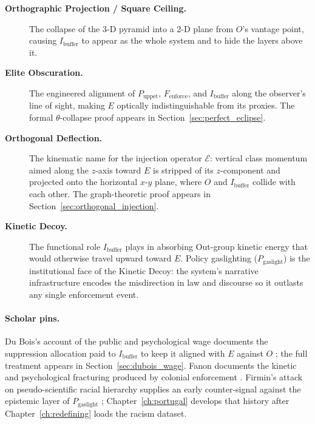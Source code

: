 \begin{description}
    \item[\textbf{Orthographic Projection / Square Ceiling.}] The collapse of
    the 3-D pyramid into a 2-D plane from $O$'s vantage point, causing
    $I_{\text{buffer}}$ to appear as the whole system and to hide the layers
    above it.

    \item[\textbf{Elite Obscuration.}] The engineered alignment of
    $P_{\text{uppet}}$, $F_{\text{enforce}}$, and $I_{\text{buffer}}$ along the
    observer's line of sight, making $E$ optically indistinguishable from its
    proxies. The formal $\theta$-collapse proof appears in
    Section~\ref{sec:perfect_eclipse}.

    \item[\textbf{Orthogonal Deflection.}] The kinematic name for the injection
    operator $\mathcal{E}$: vertical class momentum aimed along the $z$-axis
    toward $E$ is stripped of its $z$-component and projected onto the horizontal
    $x$-$y$ plane, where $O$ and $I_{\text{buffer}}$ collide with each other.
    The graph-theoretic proof appears in Section~\ref{sec:orthogonal_injection}.

    \item[\textbf{Kinetic Decoy.}] The functional role
    $I_{\text{buffer}}$ plays in absorbing Out-group kinetic energy that would
    otherwise travel upward toward $E$. Policy gaslighting
    ($P_{\text{gaslight}}$) is the institutional face of the Kinetic Decoy: the
    system's narrative infrastructure encodes the misdirection in law and
    discourse so it outlasts any single enforcement event.
\end{description}

\paragraph{Scholar pins.}
Du Bois's account of the public and psychological wage documents the suppression
allocation paid to $I_{\text{buffer}}$ to keep it aligned with $E$ against $O$
\cite{dubois}; the full treatment appears in Section~\ref{sec:dubois_wage}.
Fanon documents the kinetic and psychological fracturing produced by colonial
enforcement \cite{fanon1961}. Firmin's attack on pseudo-scientific racial
hierarchy supplies an early counter-signal against the epistemic layer of
$P_{\text{gaslight}}$ \cite{firmin_legacy}; Chapter~\ref{ch:portugal} develops
that history after Chapter~\ref{ch:redefining} loads the racism dataset.

